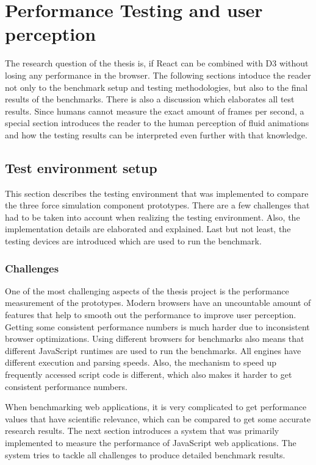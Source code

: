 \chapter{Performance Testing and user perception}
\label{cha:performance}

The research question of the thesis is, if React can be combined with D3 without losing any performance in the browser. The following sections intoduce the reader not only to the benchmark setup and testing methodologies, but also to the final results of the benchmarks. There is also a discussion which elaborates all test results. Since humans cannot measure the exact amount of frames per second, a special section introduces the reader to the human perception of fluid animations and how the testing results can be interpreted even further with that knowledge.

\section{Test environment setup}

This section describes the testing environment that was implemented to compare the three force simulation component prototypes. There are a few challenges that had to be taken into account when realizing the testing environment. Also, the implementation details are elaborated and explained. Last but not least, the testing devices are introduced which are used to run the benchmark.

\subsection{Challenges}

One of the most challenging aspects of the thesis project is the performance measurement of the prototypes. Modern browsers have an uncountable amount of features that help to smooth out the performance to improve user perception. Getting some consistent performance numbers is much harder due to inconsistent browser optimizations. Using different browsers for benchmarks also means that different JavaScript runtimes are used to run the benchmarks. All engines have different execution and parsing speeds. Also, the mechanism to speed up frequently accessed script code is different, which also makes it harder to get consistent performance numbers.

When benchmarking web applications, it is very complicated to get performance values that have scientific relevance, which can be compared to get some accurate research results. The next section introduces a system that was primarily implemented to measure the performance of JavaScript web applications. The system tries to tackle all challenges to produce detailed benchmark results.

